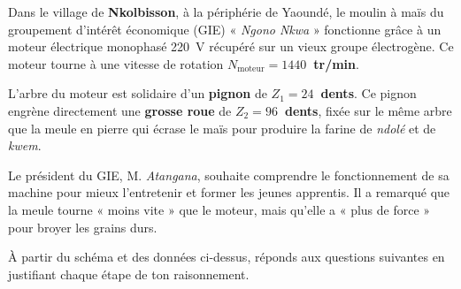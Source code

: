 \documentclass[11pt]{article}
\newcounter{popsec}
\newcounter{popsub}
\newcommand{\courssub}[1]{%
  \stepcounter{popsub}%
  \par\vspace{9pt}\noindent{\popxbold\fontsize{11.5}{13}\selectfont\color{popink}{\color{poporange}\thepopsec.\thepopsub}\hspace{6pt}#1}\par\nopagebreak\vspace{4pt}
}
\begin{document}
Dans le village de \textbf{Nkolbisson}, à la périphérie de Yaoundé, le moulin à maïs du groupement d'intérêt économique (GIE) « \emph{Ngono Nkwa} » fonctionne grâce à un moteur électrique monophasé \SI{220}{V} récupéré sur un vieux groupe électrogène. Ce moteur tourne à une vitesse de rotation \textbf{$N_{\text{moteur}} = 1440$~tr/min}.

L'arbre du moteur est solidaire d'un \textbf{pignon} de \textbf{$Z_1 = 24$~dents}. Ce pignon engrène directement une \textbf{grosse roue} de \textbf{$Z_2 = 96$~dents}, fixée sur le même arbre que la meule en pierre qui écrase le maïs pour produire la farine de \emph{ndolé} et de \emph{kwem}.

Le président du GIE, M. \emph{Atangana}, souhaite comprendre le fonctionnement de sa machine pour mieux l'entretenir et former les jeunes apprentis. Il a remarqué que la meule tourne « moins vite » que le moteur, mais qu'elle a « plus de force » pour broyer les grains durs.

\courssub{Consignes}
À partir du schéma et des données ci-dessus, réponds aux questions suivantes en justifiant chaque étape de ton raisonnement.
\end{document}
